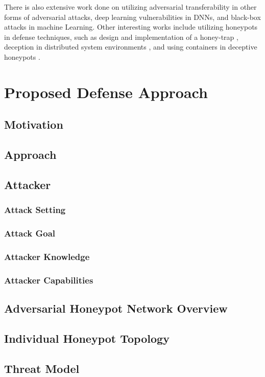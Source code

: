\documentclass[grad,lot,lof,11pt,oneside,onehalfspace]{RUthesis}
\begin{document}
\begin{enumerate}
	There is also extensive work done on utilizing adversarial transferability in other forms of adversarial attacks, deep learning vulnerabilities in DNNs, and black-box attacks in machine Learning. Other interesting works include utilizing honeypots in defense techniques, such as design and implementation of a honey-trap \cite{egupov_development_2017}, deception in distributed system environments \cite{soule_enabling_2016}, and using containers in deceptive honeypots \cite{kedrowitsch_first_2017}.
\end{enumerate}


\chapter{Proposed Defense Approach}
\label{chap-math}
\section{Motivation}
\section{Approach}
\section{Attacker}
\subsection{Attack Setting}
\subsection{Attack Goal}
\subsection{Attacker Knowledge}
\subsection{Attacker Capabilities}
\section{Adversarial Honeypot Network Overview}
\section{Individual Honeypot Topology}
\section{Threat Model}
\end{document}
